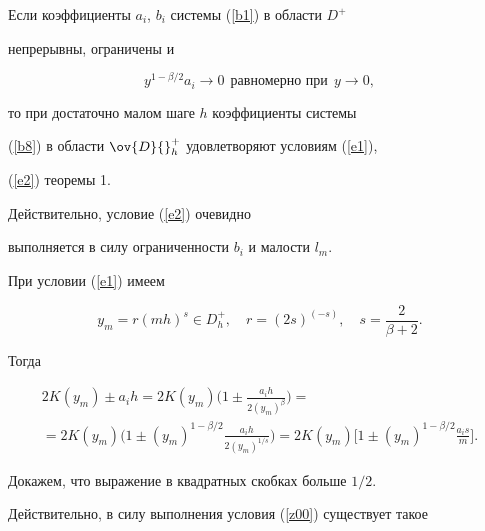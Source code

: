 \begin{note}


Если коэффициенты $a_{i}$, $b_{i}$ системы (\ref{b1}) в области ${D}^+$


непрерывны, ограничены и


\begin{equation}\label{z00}


y^{1-\beta/2}a_i \to 0\ \ 


\text{равномерно при}\ \ y \to 0,


\end{equation}


то при достаточно малом шаге $h$ коэффициенты системы


(\ref{b8}) в области $\ov{D}{}^+_h$ удовлетворяют условиям (\ref{e1}),


(\ref{e2}) теоремы 1.


\end{note}





Действительно, условие (\ref{e2}) очевидно


выполняется в силу ограниченности $b_i$ и малости $l_m$.


При условии (\ref{e1}) имеем


$$


y_{m} = r(mh)^s \in D^+_h,\quad r=(2s)^{(-s)},\quad s=\frac


{2} {\beta +2}.


$$





Тогда


\begin{multline*}


2K (y_{m} ) \pm a_ih = 2K (y_{m} )


\bigg(1 \pm \frac{a_i h }{2(y_{m})^{\beta}} \bigg) = \\


=2K (y_{m} ) \bigg(1 \pm (y_{m} )^ {1-\beta/2}


\frac{a_i h }{2(y_{m})^{1/s}} \bigg) = 2K (y_{m} )


\bigg[ 1 \pm (y_{m} )^ {1-\beta/2} \frac{a_i s}{m}\bigg].


\end{multline*}





Докажем, что выражение в квадратных скобках больше $1/2$.


Действительно, в силу выполнения условия (\ref{z00}) существует такое


